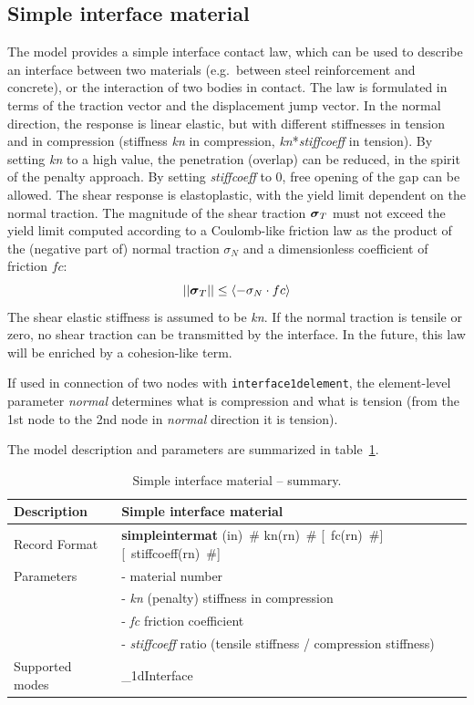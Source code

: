 \documentclass[a4paper]{article}
\newcommand{\mbf}[1]{\mbox{\boldmath$#1$}}
\newcommand{\descitem}[1]{{\noindent \bf #1}}
\newcommand{\elemparam}[2]{{{#1\tiny (#2)}~\#}}
\newcommand{\optelemparam}[2]{[{~\elemparam{#1}{#2}}]}
\newcommand{\param}[1]{{\it #1}}
\newcommand{\vsig}{\mbf{\sigma}}%
\begin{document}
\subsection{Simple interface material}

The model provides a simple interface contact law, which can be used to describe  an interface between two materials (e.g.\ between steel reinforcement and concrete),
or the interaction of two bodies in contact. The law is formulated in terms of the traction vector and the displacement jump vector. In the normal direction, the response is linear elastic, but with different stiffnesses in tension and in compression (stiffness \param{kn} in compression, \param{kn}*\param{stiffcoeff} in tension). 
By setting \param{kn} to a high value, the penetration (overlap) can be reduced,
in the spirit of the penalty approach. By setting  \param{stiffcoeff} to 0, free opening
of the gap can be allowed. 
The shear response is elastoplastic, with the yield limit dependent on the normal traction.
The magnitude of the shear traction $\vsig_T$ must not exceed the yield limit computed 
according to a Coulomb-like friction law as the product of the (negative part of)
 normal traction $\sigma_N$ and a dimensionless coefficient of friction $fc$:
\begin{equation}
	||\vsig_T|| \leq \left\langle-\sigma_N\cdot fc\right\rangle
\end{equation}
The shear elastic stiffness is assumed to be \param{kn}. If the normal traction is tensile
or zero, no shear traction can be transmitted by the interface.
In the future, this law will be enriched by a cohesion-like term.

If used in connection of two nodes with {\tt interface1delement}, the element-level parameter \param{normal} determines what is compression and what is tension (from the 1st node to the 2nd node in \param{normal} direction it is tension). 

The model description and parameters are summarized in table~\ref{simpleinterfacemat_table}.

\begin{table}[!htb]
\begin{tabular}{|l|p{9cm}|}
\hline
Description & Simple interface material\\
\hline
Record Format & \descitem{simpleintermat}  \elemparam{}{in}
\elemparam{kn}{rn} \optelemparam{fc}{rn} \optelemparam{stiffcoeff}{rn}\\
Parameters &- \param{} material number\\
&- \param{kn} (penalty) stiffness in compression\\
&- \param{fc} friction coefficient\\
&- \param{stiffcoeff} ratio (tensile stiffness / compression stiffness)\\
Supported modes& \_1dInterface\\
\hline
\end{tabular}
\caption{Simple interface material -- summary.}
\label{simpleinterfacemat_table}
\end{table}
\end{document}
